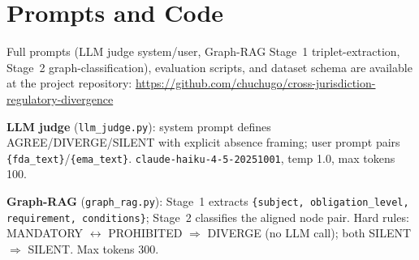 \documentclass[manuscript]{acmart}
\begin{document}
\appendix

\section{Prompts and Code}
\label{app:prompt}

Full prompts (LLM judge system/user, Graph-RAG Stage~1 triplet-extraction,
Stage~2 graph-classification), evaluation scripts, and dataset schema are
available at the project repository:
\url{https://github.com/chuchugo/cross-jurisdiction-regulatory-divergence}

\noindent\textbf{LLM judge} (\texttt{llm\_judge.py}): system prompt defines
AGREE/DIVERGE/SILENT with explicit absence framing; user prompt pairs
\texttt{\{fda\_text\}}/\texttt{\{ema\_text\}}.
\texttt{claude-haiku-4-5-20251001}, temp 1.0, max tokens 100.

\noindent\textbf{Graph-RAG} (\texttt{graph\_rag.py}): Stage~1 extracts
\texttt{\{subject, obligation\_level, requirement, conditions\}}; Stage~2
classifies the aligned node pair. Hard rules: MANDATORY $\leftrightarrow$
PROHIBITED $\Rightarrow$ DIVERGE (no LLM call); both SILENT $\Rightarrow$
SILENT. Max tokens 300.
\end{document}
